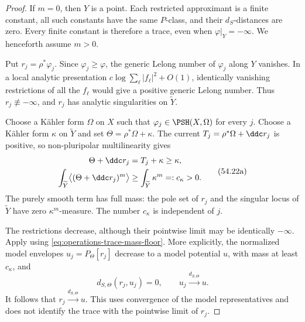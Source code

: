 \begin{proof}
If $m=0$, then $Y$ is a point.  Each restricted approximant is a
finite constant, all such constants have the same $P$-class,
and their $d_S$-distances are zero.  Every finite constant is
therefore a trace, even when $\varphi|_Y=-\infty$.
We henceforth assume $m>0$.

Put $r_j=\rho^*\varphi_j$.
Since $\varphi_j\geq\varphi$, the generic Lelong number of
$\varphi_j$ along $Y$ vanishes.  In a local analytic presentation
$c\log\sum_\ell|f_\ell|^2+O(1)$, identically vanishing restrictions
of all the $f_\ell$ would give a positive generic Lelong number.
Thus $r_j\not\equiv-\infty$, and $r_j$ has analytic singularities
on $\widetilde Y$.

Choose a K\"ahler form $\Omega$ on $X$ such that
$\varphi_j\in\PSH(X,\Omega)$ for every $j$.
Choose a K\"ahler form $\kappa$ on $\widetilde Y$ and set
$\Theta=\rho^*\Omega+\kappa$.
The current $T_j=\rho^*\Omega+\ddc r_j$ is positive, so
non-pluripolar multilinearity gives
\[
 \begin{split}
 \Theta+\ddc r_j&=T_j+\kappa\geq\kappa,\\
 \int_{\widetilde Y}\bigl\langle
       (\Theta+\ddc r_j)^m\bigr\rangle
   &\geq\int_{\widetilde Y}\kappa^m=:c_\kappa>0.
 \end{split}
\tag{54.22a}\label{eq:operations-trace-mass-floor}
\]
The purely smooth term has full mass: the pole set of $r_j$ and
the singular locus of $\widetilde Y$ have zero $\kappa^m$-measure.
The number $c_\kappa$ is independent of $j$.

The restrictions decrease, although their pointwise limit may be
identically $-\infty$.  Apply
\cite[Corollary~6.2.7]{XiaBook} using
\eqref{eq:operations-trace-mass-floor}.
More explicitly, the normalized model envelopes
$u_j=P_\Theta[r_j]$ decrease to a model potential $u$, with
mass at least $c_\kappa$, and
\[
 d_{S,\Theta}(r_j,u_j)=0,\qquad
 u_j\xrightarrow{d_{S,\Theta}}u.
\tag{54.22b}\label{eq:operations-trace-model-limit}
\]
It follows that $r_j\xrightarrow{d_{S,\Theta}}u$.
This uses convergence of the model representatives and does not
identify the trace with the pointwise limit of $r_j$.


\end{proof}
